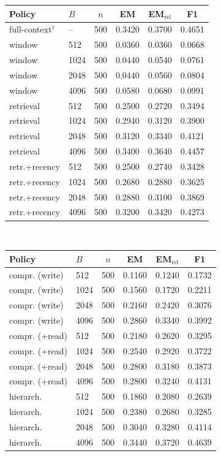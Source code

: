 \begin{tabular}{@{}llcccc@{}}
\toprule
Policy & $B$ & $n$ & EM & EM$_{\text{rel}}$ & F1 \\
\midrule
full-context$^{\dagger}$ & -- & 500 & 0.3420 & 0.3700 & 0.4651 \\
window & 512 & 500 & 0.0360 & 0.0360 & 0.0668 \\
window & 1024 & 500 & 0.0440 & 0.0540 & 0.0761 \\
window & 2048 & 500 & 0.0440 & 0.0560 & 0.0804 \\
window & 4096 & 500 & 0.0580 & 0.0680 & 0.0991 \\
retrieval & 512 & 500 & 0.2500 & 0.2720 & 0.3494 \\
retrieval & 1024 & 500 & 0.2940 & 0.3120 & 0.3900 \\
retrieval & 2048 & 500 & 0.3120 & 0.3340 & 0.4121 \\
retrieval & 4096 & 500 & 0.3400 & 0.3640 & 0.4457 \\
retr.+recency & 512 & 500 & 0.2500 & 0.2740 & 0.3428 \\
retr.+recency & 1024 & 500 & 0.2680 & 0.2880 & 0.3625 \\
retr.+recency & 2048 & 500 & 0.2880 & 0.3100 & 0.3869 \\
retr.+recency & 4096 & 500 & 0.3200 & 0.3420 & 0.4273 \\
\bottomrule
\end{tabular}~~%
\begin{tabular}{@{}llcccc@{}}
\toprule
Policy & $B$ & $n$ & EM & EM$_{\text{rel}}$ & F1 \\
\midrule
compr. (write) & 512 & 500 & 0.1160 & 0.1240 & 0.1732 \\
compr. (write) & 1024 & 500 & 0.1560 & 0.1720 & 0.2211 \\
compr. (write) & 2048 & 500 & 0.2160 & 0.2420 & 0.3076 \\
compr. (write) & 4096 & 500 & 0.2860 & 0.3340 & 0.3992 \\
compr. (+read) & 512 & 500 & 0.2180 & 0.2620 & 0.3295 \\
compr. (+read) & 1024 & 500 & 0.2540 & 0.2920 & 0.3722 \\
compr. (+read) & 2048 & 500 & 0.2800 & 0.3180 & 0.3873 \\
compr. (+read) & 4096 & 500 & 0.2800 & 0.3240 & 0.4131 \\
hierarch. & 512 & 500 & 0.1860 & 0.2080 & 0.2639 \\
hierarch. & 1024 & 500 & 0.2380 & 0.2680 & 0.3285 \\
hierarch. & 2048 & 500 & 0.3040 & 0.3280 & 0.4114 \\
hierarch. & 4096 & 500 & 0.3440 & 0.3720 & 0.4639 \\
\bottomrule
\end{tabular}